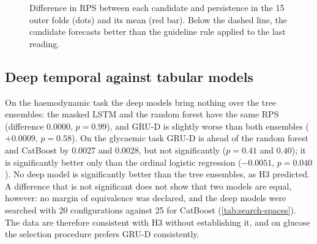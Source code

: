 \begin{figure}[htbp]
\centering
{}
\caption{Difference in RPS between each candidate and persistence in the 15 outer folds (dots) and its mean (red bar). Below the dashed line, the candidate forecasts better than the guideline rule applied to the last reading.}\label{fig:delta-rps}
\end{figure}




\subsection{Deep temporal against tabular models}

On the haemodynamic task the deep models bring nothing over the tree ensembles: the masked LSTM and the random forest have the same RPS (difference $0.0000$, $p = 0.99$), and GRU-D is slightly worse than both ensembles ($+0.0009$, $p = 0.58$). On the glycaemic task GRU-D is ahead of the random forest and CatBoost by 0.0027 and 0.0028, but not significantly ($p = 0.41$ and $0.40$); it is significantly better only than the ordinal logistic regression ($-0.0051$, $p = 0.040$). No deep model is significantly better than the tree ensembles, as H3 predicted. A difference that is not significant does not show that two models are equal, however: no margin of equivalence was declared, and the deep models were searched with 20 configurations against 25 for CatBoost (\cref{tab:search-spaces}). The data are therefore consistent with H3 without establishing it, and on glucose the selection procedure prefers GRU-D consistently.

